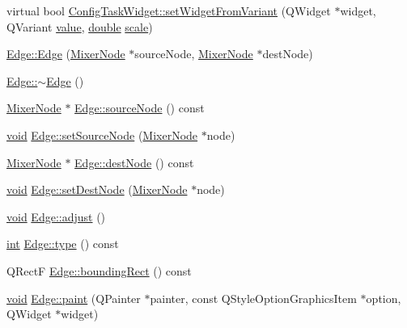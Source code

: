 \begin{DoxyCompactItemize}
\item 
virtual bool \hyperlink{group___u_a_v_object_widget_utils_gac37260311f36d40dcb9dce65e025c426}{Config\-Task\-Widget\-::set\-Widget\-From\-Variant} (Q\-Widget $\ast$widget, Q\-Variant \hyperlink{glext_8h_aa0e2e9cea7f208d28acda0480144beb0}{value}, \hyperlink{_super_l_u_support_8h_a8956b2b9f49bf918deed98379d159ca7}{double} \hyperlink{glext_8h_a281421b881aa7a1266842b73a3bc7655}{scale})
\item 
\hyperlink{group___u_a_v_object_widget_utils_gaaaf462ed746395725efc1ecc8ea00ec4}{Edge\-::\-Edge} (\hyperlink{class_mixer_node}{Mixer\-Node} $\ast$source\-Node, \hyperlink{class_mixer_node}{Mixer\-Node} $\ast$dest\-Node)
\item 
\hyperlink{group___u_a_v_object_widget_utils_ga2f37b72f044427961d6730943daf10e0}{Edge\-::$\sim$\-Edge} ()
\item 
\hyperlink{class_mixer_node}{Mixer\-Node} $\ast$ \hyperlink{group___u_a_v_object_widget_utils_ga9d06da5f40991dc21459764c5e3783b1}{Edge\-::source\-Node} () const 
\item 
\hyperlink{group___u_a_v_objects_plugin_ga444cf2ff3f0ecbe028adce838d373f5c}{void} \hyperlink{group___u_a_v_object_widget_utils_gacc2025ad40fdd1225c77d3814bd356d2}{Edge\-::set\-Source\-Node} (\hyperlink{class_mixer_node}{Mixer\-Node} $\ast$node)
\item 
\hyperlink{class_mixer_node}{Mixer\-Node} $\ast$ \hyperlink{group___u_a_v_object_widget_utils_ga63800818ac0cf98ea9cff4ba44532c4d}{Edge\-::dest\-Node} () const 
\item 
\hyperlink{group___u_a_v_objects_plugin_ga444cf2ff3f0ecbe028adce838d373f5c}{void} \hyperlink{group___u_a_v_object_widget_utils_gac291239456c76a2347f0d94e1aa8b14c}{Edge\-::set\-Dest\-Node} (\hyperlink{class_mixer_node}{Mixer\-Node} $\ast$node)
\item 
\hyperlink{group___u_a_v_objects_plugin_ga444cf2ff3f0ecbe028adce838d373f5c}{void} \hyperlink{group___u_a_v_object_widget_utils_gab554a765fd7a57fcdf289aa51b4df328}{Edge\-::adjust} ()
\item 
\hyperlink{ioapi_8h_a787fa3cf048117ba7123753c1e74fcd6}{int} \hyperlink{group___u_a_v_object_widget_utils_ga8ad60980ad4024691e462442f64eb7d2}{Edge\-::type} () const 
\item 
Q\-Rect\-F \hyperlink{group___u_a_v_object_widget_utils_ga1715832a609af81720fbed8340ddcd51}{Edge\-::bounding\-Rect} () const 
\item 
\hyperlink{group___u_a_v_objects_plugin_ga444cf2ff3f0ecbe028adce838d373f5c}{void} \hyperlink{group___u_a_v_object_widget_utils_ga6fb73701d0e4739f569e1ea0eb4c36fa}{Edge\-::paint} (Q\-Painter $\ast$painter, const Q\-Style\-Option\-Graphics\-Item $\ast$option, Q\-Widget $\ast$widget)

\end{DoxyCompactItemize}
